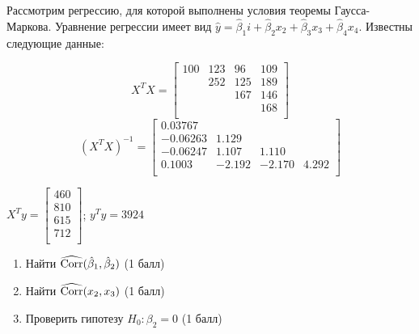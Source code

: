 \documentclass[pdftex,11pt,openany]{book}\usepackage[]{graphicx}\usepackage[]{color}
\begin{document}
\begin{problem}
Рассмотрим регрессию, для которой выполнены условия теоремы Гаусса-Маркова. Уравнение регрессии имеет вид $\hat{y} = \hat{\beta}_1 i + \hat{\beta}_2 x_2 + \hat{\beta}_3 x_3 + \hat{\beta}_4 x_4$. Известны следующие данные:

\[
X^T X = \begin{bmatrix}
100 & 123 & 96 & 109 \\
 & 252 & 125 & 189 \\
 & & 167 & 146 \\
 & & & 168 \\
\end{bmatrix}
\]
\[
(X^TX)^{-1} = \begin{bmatrix}
0.03767 & & & \\
-0.06263 & 1.129 & & \\
-0.06247 & 1.107 & 1.110 & \\
0.1003 & -2.192 & -2.170 & 4.292 \\
\end{bmatrix}
\] 

$X^Ty = \begin{bmatrix}
460\\
810\\
615\\
712\\
\end{bmatrix}$; $y^Ty = 3924$

\begin{enumerate}
\item Найти $\widehat{\operatorname{Corr}}(\hat{\beta}_1, \hat{\beta}_2)$ (1 балл)
\item Найти $\widehat{\operatorname{Corr}}(x_2, x_3)$ (1 балл)
\item Проверить гипотезу $H_0: \beta_2 = 0$ (1 балл)
\end{enumerate}
\end{problem}
\end{document}
